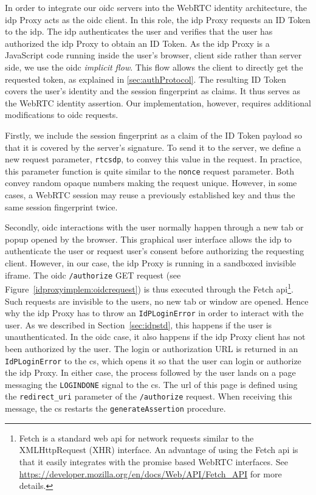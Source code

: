 In order to integrate our \gls{oidc} servers into the WebRTC identity architecture, the \gls{idp} Proxy acts as the \gls{oidc} client.
In this role, the \gls{idp} Proxy requests an ID Token to the \gls{idp}.
The \gls{idp} authenticates the user and verifies that the user has authorized the \gls{idp} Proxy to obtain an ID Token.
As the \gls{idp} Proxy is a JavaScript code running inside the user's browser, \ie client side rather than server side, we use the \gls{oidc} \textit{implicit flow}.
This flow allows the client to directly get the requested token, as explained in \ref{sec:authProtocol}.
The resulting ID Token covers the user's identity and the session fingerprint as claims.
It thus serves as the WebRTC identity assertion.
Our implementation, however, requires additional modifications to \gls{oidc} requests.

Firstly, we include the session fingerprint as a claim of the ID Token payload so that it is covered by the server's signature.
To send it to the server, we define a new request parameter, \texttt{rtcsdp}, to convey this value in the request.
In practice, this parameter function is quite similar to the \texttt{nonce} request parameter.
Both convey random opaque numbers making the request unique.
However, in some cases, a WebRTC session may reuse a previously established key and thus the same session fingerprint twice.

Secondly, \gls{oidc} interactions with the user normally happen through a new tab or popup opened by the browser.
This graphical user interface allows the \gls{idp} to authenticate the user or request user's consent before authorizing the requesting client.
However, in our case, the \gls{idp} Proxy is running in a sandboxed invisible iframe.
The \gls{oidc} \texttt{/authorize} GET request (see Figure~\ref{idproxyimplem:oidcrequest}) is thus executed through the Fetch \gls{api}\footnote{Fetch is a standard web \gls{api} for network requests similar to the XMLHttpRequest (XHR) interface. An advantage of using the Fetch \gls{api} is that it easily integrates with the promise based WebRTC interfaces. See \url{https://developer.mozilla.org/en/docs/Web/API/Fetch\_API} for more details.}.
Such requests are invisible to the users, no new tab or window are opened.
Hence why the \gls{idp} Proxy has to throw an \texttt{IdPLoginError} in order to interact with the user.
As we described in Section~\ref{sec:idpstd}, this happens if the user is unauthenticated.
In the \gls{oidc} case, it also happens if the \gls{idp} Proxy client has not been authorized by the user.
The login or authorization URL is returned in an \texttt{IdPLoginError} to the \gls{cs}, which opens it so that the user can login or authorize the \gls{idp} Proxy.
In either case, the process followed by the user lands on a page messaging the \texttt{LOGINDONE} signal to the \gls{cs}.
The url of this page is defined using the \texttt{redirect\_uri} parameter of the \texttt{/authorize} request.
When receiving this message, the \gls{cs} restarts the \texttt{generateAssertion} procedure.

